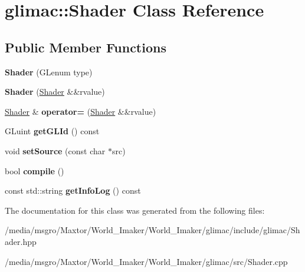 \hypertarget{classglimac_1_1Shader}{}\section{glimac\+:\+:Shader Class Reference}
\label{classglimac_1_1Shader}
\subsection*{Public Member Functions}
\begin{DoxyCompactItemize}
\item 
\mbox{\label{classglimac_1_1Shader_a064a1d24851c1c405d3c912cff9521c4}} 
{\bfseries Shader} (G\+Lenum type)
\item 
\mbox{\label{classglimac_1_1Shader_a98bf794b782f89a7a5c859607e6dc62b}} 
{\bfseries Shader} (\hyperlink{classglimac_1_1Shader}{Shader} \&\&rvalue)
\item 
\mbox{\label{classglimac_1_1Shader_a0790eeb7a9fc154161bee6b78e287828}} 
\hyperlink{classglimac_1_1Shader}{Shader} \& {\bfseries operator=} (\hyperlink{classglimac_1_1Shader}{Shader} \&\&rvalue)
\item 
\mbox{\label{classglimac_1_1Shader_a46c21c4b6b9ee89426b458695897202e}} 
G\+Luint {\bfseries get\+G\+L\+Id} () const
\item 
\mbox{\label{classglimac_1_1Shader_a66701118e7f1d789a258936c82b32874}} 
void {\bfseries set\+Source} (const char $\ast$src)
\item 
\mbox{\label{classglimac_1_1Shader_a1e6c6814a6275dd698b3befdb89aa647}} 
bool {\bfseries compile} ()
\item 
\mbox{\label{classglimac_1_1Shader_aa0de6702041087187d8eca874000cfa6}} 
const std\+::string {\bfseries get\+Info\+Log} () const
\end{DoxyCompactItemize}


The documentation for this class was generated from the following files\+:\begin{DoxyCompactItemize}
\item 
/media/msgro/\+Maxtor/\+World\+\_\+\+Imaker/\+World\+\_\+\+Imaker/glimac/include/glimac/Shader.\+hpp\item 
/media/msgro/\+Maxtor/\+World\+\_\+\+Imaker/\+World\+\_\+\+Imaker/glimac/src/Shader.\+cpp\end{DoxyCompactItemize}
